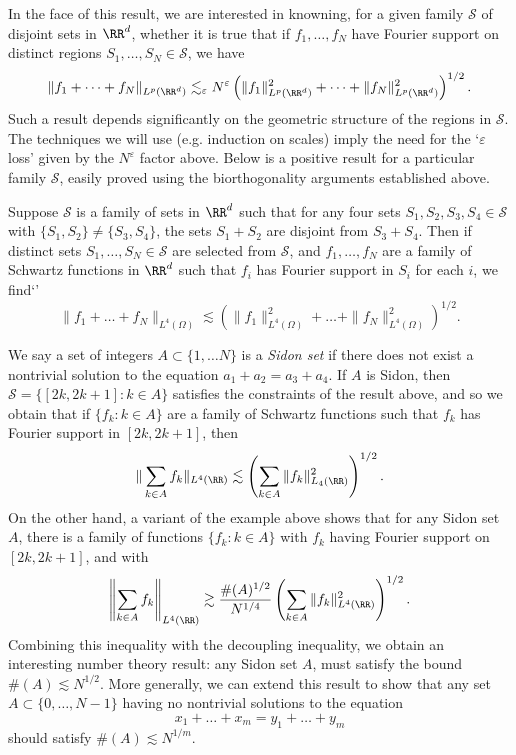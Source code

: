 In the face of this result, we are interested in knowning, for a given family $\mathcal{S}$ of disjoint sets in $\RR^d$, whether it is true that if $f_1, \dots, f_N$ have Fourier support on distinct regions $S_1, \dots, S_N \in \mathcal{S}$, we have
%
\[ \| f_1 + \dots + f_N \|_{L^p(\RR^d)} \lesssim_\varepsilon N^\varepsilon \left( \| f_1 \|_{L^p(\RR^d)}^2 + \dots + \| f_N \|_{L^p(\RR^d)}^2 \right)^{1/2}. \]
%
Such a result depends significantly on the geometric structure of the regions in $\mathcal{S}$. The techniques we will use (e.g. induction on scales) imply the need for the `$\varepsilon$ loss' given by the $N^\varepsilon$ factor above. Below is a positive result for a particular family $\mathcal{S}$, easily proved using the biorthogonality arguments established above.

\begin{theorem}
  Suppose $\mathcal{S}$ is a family of sets in $\RR^d$ such that for any four sets $S_1,S_2,S_3,S_4 \in \mathcal{S}$ with $\{ S_1, S_2 \} \neq \{ S_3, S_4 \}$, the sets $S_1 + S_2$ are disjoint from $S_3 + S_4$. Then if distinct sets $S_1, \dots, S_N \in \mathcal{S}$ are selected from $\mathcal{S}$, and $f_1, \dots, f_N$ are a family of Schwartz functions in $\RR^d$ such that $f_i$ has Fourier support in $S_i$ for each $i$, we find`'
  \[ \| f_1 + \dots + f_N \|_{L^4(\Omega)} \lesssim \left( \| f_1 \|_{L^4(\Omega)}^2 + \dots + \| f_N \|_{L^4(\Omega)}^2 \right)^{1/2}. \]
\end{theorem}

\begin{remark}
  We say a set of integers $A \subset \{ 1, \dots N \}$ is a \emph{Sidon set} if there does not exist a nontrivial solution to the equation $a_1 + a_2 = a_3 + a_4$. If $A$ is Sidon, then $\mathcal{S} = \{ [2k,2k+1]: k \in A \}$ satisfies the constraints of the result above, and so we obtain that if $\{ f_k: k \in A \}$ are a family of Schwartz functions such that $f_k$ has Fourier support in $[2k,2k+1]$, then
  \[ \| \sum_{k \in A} f_k \|_{L^4(\RR)} \lesssim \left( \sum_{k \in A} \| f_k \|_{L_4(\RR)}^2 \right)^{1/2}. \]
  On the other hand, a variant of the example above shows that for any Sidon set $A$, there is a family of functions $\{ f_k : k \in A \}$ with $f_k$ having Fourier support on $[2k,2k+1]$, and with
  \[ \left\| \sum_{k \in A} f_k \right\|_{L^4(\RR)} \gtrsim \frac{\#(A)^{1/2}}{N^{1/4}} \left( \sum_{k \in A} \| f_k \|_{L^4(\RR)}^2 \right)^{1/2}. \]
  Combining this inequality with the decoupling inequality, we obtain an interesting number theory result: any Sidon set $A$, must satisfy the bound $\#(A) \lesssim N^{1/2}$. More generally, we can extend this result to show that any set $A \subset \{ 0, \dots, N-1 \}$ having no nontrivial solutions to the equation
  \[ x_1 + \dots + x_m = y_1 + \dots + y_m \]
  should satisfy $\#(A) \lesssim N^{1/m}$.
\end{remark}

